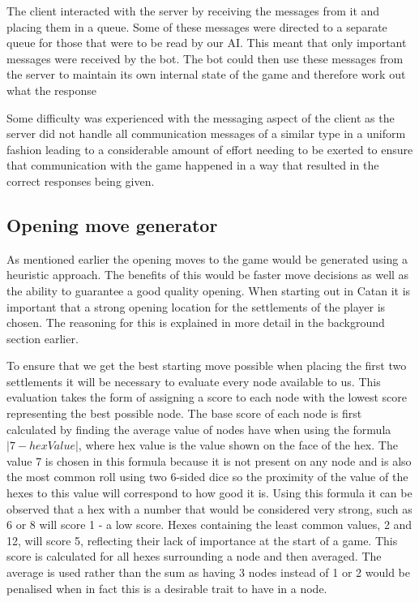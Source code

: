 \documentclass[]{article}
\begin{document}
\par The client interacted with the server by receiving the messages from it and placing them in a queue. Some of these messages were directed to a separate queue for those that were to be read by our AI. This meant that only important messages were received by the bot. The bot could then use these messages from the server to maintain its own internal state of the game and therefore work out what the response

\par Some difficulty was experienced with the messaging aspect of the client as the server did not handle all communication messages of a similar type in a uniform fashion leading to a considerable amount of effort needing to be exerted to ensure that communication with the game happened in a way that resulted in the correct responses being given. 
 
\subsection{Opening move generator}
As mentioned earlier the opening moves to the game would be generated using a heuristic approach. The benefits of this would be faster move decisions as well as the ability to guarantee a good quality opening. When starting out in Catan it is important that a strong opening location for the settlements of the player is chosen. The reasoning for this is explained in more detail in the background section earlier.
 
\par To ensure that we get the best starting move possible when placing the first two settlements it will be necessary to evaluate every node available to us. This evaluation takes the form of assigning a score to each node with the lowest score representing the best possible node. The base score of each node is first calculated by finding the average value of nodes have when using the formula $|7-hexValue|$, where hex value is the value shown on the face of the hex. The value 7 is chosen in this formula because it is not present on any node and is also the most common roll using two 6-sided dice so the proximity of the value of the hexes to this value will correspond to how good it is. Using this formula it can be observed that a hex with a number that would be considered very strong, such as 6 or 8 will score 1 - a low score. Hexes containing the least common values, 2 and 12, will score 5, reflecting their lack of importance at the start of a game. This score is calculated for all hexes surrounding a node and then averaged. The average is used rather than the sum as having 3 nodes instead of 1 or 2 would be penalised when in fact this is a desirable trait to have in a node. 
\end{document}
